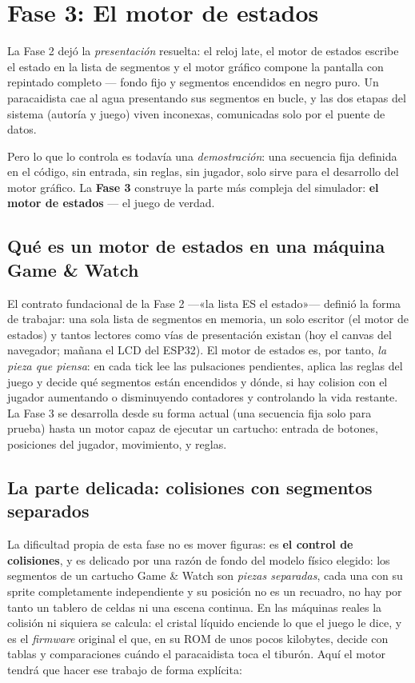 \section{Fase 3: El motor de estados}
\label{sec:FaseTres}

La Fase 2 dejó la \emph{presentación} resuelta: el reloj late, el motor de
estados escribe el estado en la lista de segmentos y el motor gráfico compone la pantalla
con repintado completo --- fondo fijo y segmentos encendidos en negro puro. Un paracaidista
cae al agua presentando sus segmentos en bucle, y las dos etapas del sistema
(autoría y juego) viven inconexas, comunicadas solo por el puente de datos. 

Pero lo que lo controla es todavía una \emph{demostración}: una secuencia fija definida en el código, sin entrada, sin reglas, sin jugador, solo sirve para el desarrollo del motor gráfico. La \textbf{Fase 3} construye la parte más compleja del simulador: \textbf{el motor de estados} --- el juego de verdad.

\subsection{Qué es un motor de estados en una máquina Game \& Watch}
\label{subsec:QueEsMotorEstados}

El contrato fundacional de la Fase 2 ---«la lista ES el estado»--- definió la forma de
trabajar: una sola lista de segmentos en memoria, un solo escritor (el motor de estados) y
tantos lectores como vías de presentación existan (hoy el canvas del navegador; mañana el
LCD del ESP32). El motor de estados es, por tanto, \emph{la pieza que piensa}: en cada tick
lee las pulsaciones pendientes, aplica las reglas del juego y decide qué segmentos están
encendidos y dónde, si hay colision con el jugador aumentando o disminuyendo contadores y controlando la vida restante. La Fase 3 se desarrolla desde su forma actual (una secuencia fija solo para prueba) hasta un motor capaz de ejecutar un cartucho: entrada de botones, posiciones del jugador, movimiento, y reglas.

\subsection{La parte delicada: colisiones con segmentos separados}
\label{subsec:ColisionesDelicadas}

La dificultad propia de esta fase no es mover figuras: es \textbf{el control de colisiones}, y es delicado por una razón de fondo del modelo físico elegido: los segmentos de un cartucho Game \& Watch son \emph{piezas separadas}, cada una con su sprite completamente independiente y su posición no es un recuadro, no hay por tanto un tablero de celdas ni una escena continua. En las máquinas reales la colisión ni siquiera se calcula: el cristal líquido enciende lo que el juego le dice, y es el \emph{firmware} original el que, en su ROM de unos pocos kilobytes, decide con tablas y comparaciones cuándo el paracaidista toca el tiburón. Aquí el motor tendrá que hacer ese
trabajo de forma explícita:

